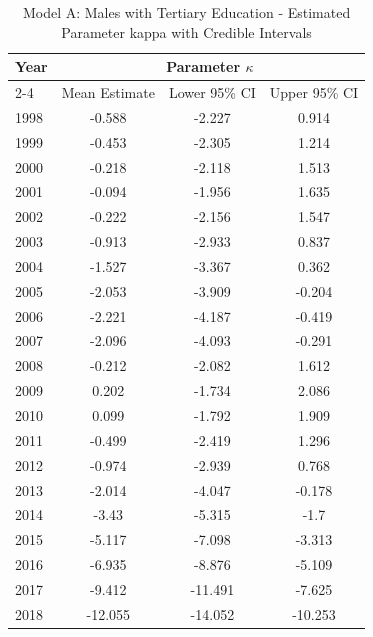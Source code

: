 \begin{landscape}
\begin{table}[htbp]
\centering
\caption{Model A: Males with Tertiary Education - Estimated Parameter kappa  with Credible Intervals}
\label{tab:parameters_k8}
\begin{tabular}{@{}lccc@{}}
\toprule
Year & \multicolumn{3}{c}{Parameter \(\kappa\)} \\
\cmidrule(lr){2-4}
      & Mean Estimate & Lower 95\% CI & Upper 95\% CI \\
\midrule
1998 & -0.588 & -2.227 & 0.914 \\
1999 & -0.453 & -2.305 & 1.214 \\
2000 & -0.218 & -2.118 & 1.513 \\
2001 & -0.094 & -1.956 & 1.635 \\
2002 & -0.222 & -2.156 & 1.547 \\
2003 & -0.913 & -2.933 & 0.837 \\
2004 & -1.527 & -3.367 & 0.362 \\
2005 & -2.053 & -3.909 & -0.204 \\
2006 & -2.221 & -4.187 & -0.419 \\
2007 & -2.096 & -4.093 & -0.291 \\
2008 & -0.212 & -2.082 & 1.612 \\
2009 & 0.202 & -1.734 & 2.086 \\
2010 & 0.099 & -1.792 & 1.909 \\
2011 & -0.499 & -2.419 & 1.296 \\
2012 & -0.974 & -2.939 & 0.768 \\
2013 & -2.014 & -4.047 & -0.178 \\
2014 & -3.43 & -5.315 & -1.7 \\
2015 & -5.117 & -7.098 & -3.313 \\
2016 & -6.935 & -8.876 & -5.109 \\
2017 & -9.412 & -11.491 & -7.625 \\
2018 & -12.055 & -14.052 & -10.253 \\
\bottomrule
\end{tabular}
\end{table}
\end{landscape}